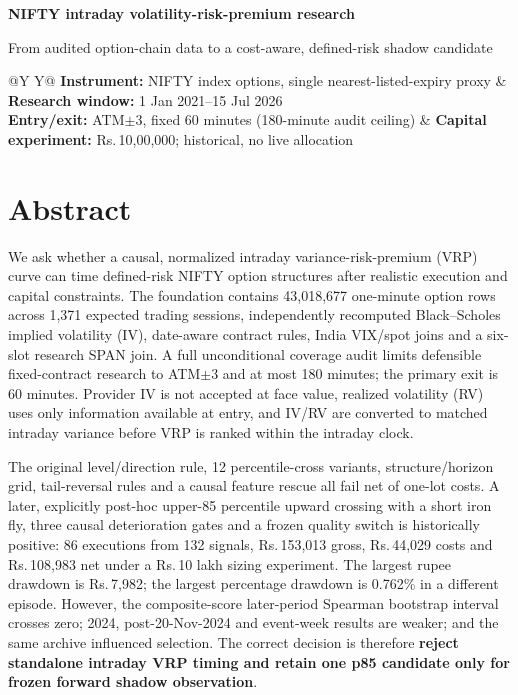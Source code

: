 \documentclass[10pt,a4paper]{article}
\newcommand{\INR}{\textsf{Rs.}\,}
\begin{document}
\fontsize{8.35}{10.05}\selectfont

{\fontsize{20}{22}\selectfont\bfseries\color{Navy} NIFTY intraday volatility-risk-premium research}\par
\vspace{1mm}
{\large\color{Blue} From audited option-chain data to a cost-aware, defined-risk shadow candidate}\par
\vspace{2mm}
\begin{tabularx}{\linewidth}{@{}Y Y@{}}
\textbf{Instrument:} NIFTY index options, single nearest-listed-expiry proxy &
\textbf{Research window:} 1 Jan 2021--15 Jul 2026 \\
\textbf{Entry/exit:} ATM$\pm3$, fixed 60 minutes (180-minute audit ceiling) &
\textbf{Capital experiment:} \INR10,00,000; historical, no live allocation \\
\end{tabularx}

\section*{Abstract}
We ask whether a causal, normalized intraday variance-risk-premium (VRP) curve can time defined-risk NIFTY option structures after realistic execution and capital constraints. The foundation contains 43,018,677 one-minute option rows across 1,371 expected trading sessions, independently recomputed Black--Scholes implied volatility (IV), date-aware contract rules, India VIX/spot joins and a six-slot research SPAN join. A full unconditional coverage audit limits defensible fixed-contract research to ATM$\pm3$ and at most 180 minutes; the primary exit is 60 minutes. Provider IV is not accepted at face value, realized volatility (RV) uses only information available at entry, and IV/RV are converted to matched intraday variance before VRP is ranked within the intraday clock.

The original level/direction rule, 12 percentile-cross variants, structure/horizon grid, tail-reversal rules and a causal feature rescue all fail net of one-lot costs. A later, explicitly post-hoc upper-85 percentile upward crossing with a short iron fly, three causal deterioration gates and a frozen quality switch is historically positive: 86 executions from 132 signals, \INR153,013 gross, \INR44,029 costs and \INR108,983 net under a \INR10 lakh sizing experiment. The largest rupee drawdown is \INR7,982; the largest percentage drawdown is 0.762\% in a different episode. However, the composite-score later-period Spearman bootstrap interval crosses zero; 2024, post-20-Nov-2024 and event-week results are weaker; and the same archive influenced selection. The correct decision is therefore \textbf{reject standalone intraday VRP timing and retain one p85 candidate only for frozen forward shadow observation}.
\end{document}
